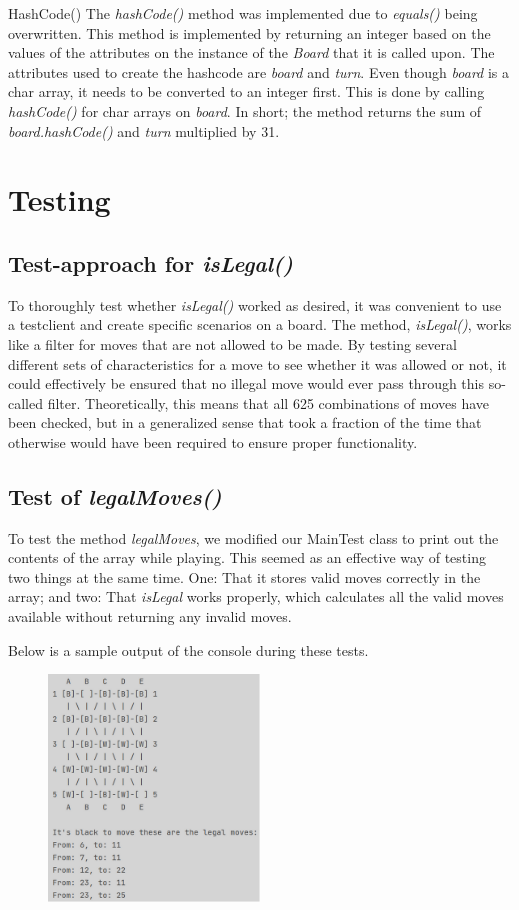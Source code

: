 \documentclass[12pt, a4paper]{article}
\begin{document}
HashCode()
The \emph{hashCode()} method was implemented due to \emph{equals()} being overwritten. This method is implemented by returning an integer based on the values of the attributes on the instance of the \emph{Board} that it is called upon. The attributes used to create the hashcode are \emph{board} and \emph{turn}. Even though \emph{board} is a char array, it needs to be converted to an integer first. This is done by calling \emph{hashCode()} for char arrays on \emph{board}. In short; the method returns the sum of \emph{board.hashCode()} and \emph{turn} multiplied by 31.
	
\section{Testing}

\subsection{Test-approach for \emph{isLegal()}}
To thoroughly test whether \emph{isLegal()} worked as desired, it was convenient to use a testclient and create specific scenarios on a board. The method, \emph{isLegal()}, works like a filter for moves that are not allowed to be made. By testing several different sets of characteristics for a move to see whether it was allowed or not, it could effectively be ensured that no illegal move would ever pass through this so-called filter. Theoretically, this means that all 625 combinations of moves have been checked, but in a generalized sense that took a fraction of the time that otherwise would have been required to ensure proper functionality.

\subsection{Test of \emph{legalMoves()}}
To test the method \emph{legalMoves}, we modified our MainTest class to print out the contents of the array while playing. This seemed as an effective way of testing two things at the same time. One: That it stores valid moves correctly in the array; and two: That \emph{isLegal} works properly, which calculates all the valid moves available without returning any invalid moves. \par
Below is a sample output of the console during these tests.

\begin{figure}[h]
	\centering
	\includegraphics[width=0.5\textwidth]{isLegalprint.png}		
\end{figure}
\end{document}
